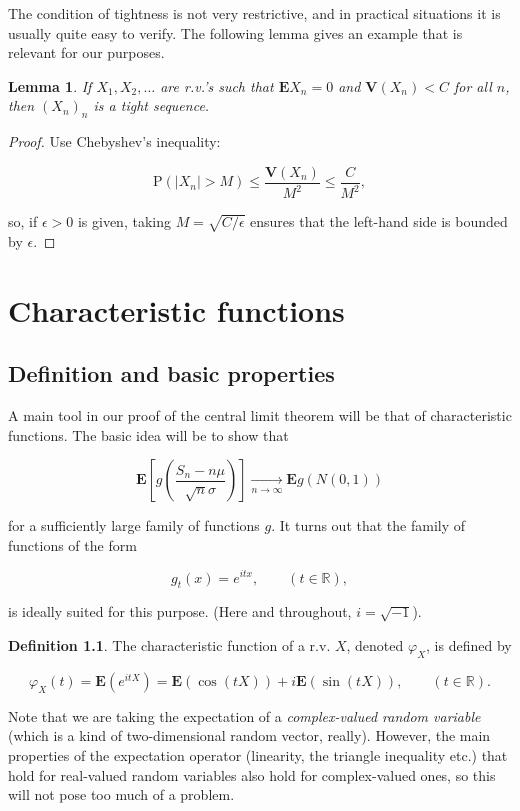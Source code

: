 \documentclass[11pt]{report}
\newcommand{\R}{\mathbb{R}}
\theoremstyle{plain}
\newtheorem{lem}[thm]{Lemma}
\theoremstyle{definition}
\newtheorem{defn}[thm]{Definition}
\begin{document}
The condition of tightness is not very restrictive,
and in practical situations it is usually quite easy
to verify. The following lemma gives an example that
is relevant for our purposes.

\begin{lem}
If $X_1,X_2,\ldots$ are r.v.'s such that
$\mathbf{E} X_n=0$ and $\mathbf{V}(X_n)<C$ for all
$n$, then $(X_n)_n$ is a tight sequence.
\end{lem}

\begin{proof}
Use Chebyshev's inequality:

\[
\mathrm{P}(|X_n|>M) \le \frac{\mathbf{V}(X_n)}{M^2} \le \frac{C}{M^2},
\]

so, if $\epsilon>0$ is given, taking
$M=\sqrt{C/\epsilon}$ ensures that the left-hand side
is bounded by $\epsilon$.
\end{proof}

\chapter{Characteristic functions}

\section{Definition and basic properties}
A main tool in our proof of the central limit theorem
will be that of characteristic functions. The basic
idea will be to show that

\[
\mathbf{E}\left[ g\left( \frac{S_n-n\mu}{\sqrt{n}\sigma}\right)\right] \xrightarrow[n\to\infty]{} \mathbf{E} g(N(0,1))
\]

for a sufficiently large family of functions $g$. It
turns out that the family of functions of the form

\[
g_t(x) = e^{itx}, \qquad (t\in\R),
\]

is ideally suited for this purpose. (Here and
throughout, $i=\sqrt{-1}$).

\begin{defn}
The characteristic function of a r.v. $X$, denoted
$\varphi_X$, is defined by

\[
\varphi_X(t) = \mathbf{E}\left(e^{i t X}\right) = \mathbf{E}(\cos(t X)) + i \mathbf{E}(\sin(t X)), \qquad (t\in\R).
\]

\end{defn}

Note that we are taking the expectation of a
\emph{complex-valued random variable} (which is a kind of
two-dimensional random vector, really). However, the
main properties of the expectation operator
(linearity, the triangle inequality etc.) that hold
for real-valued random variables also hold for
complex-valued ones, so this will not pose too much of
a problem.
\end{document}
